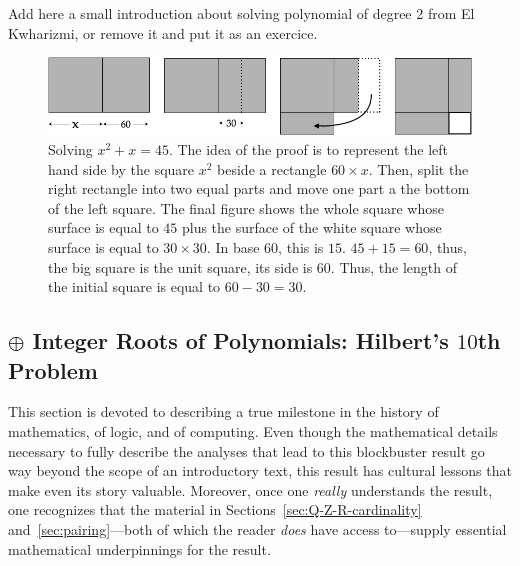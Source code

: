 {}
{\Denis Add here a small introduction about solving polynomial of degree 2 from El Kwharizmi, or remove it and put it as an exercice.}
\begin{figure}[htb]
\begin{center}
       \includegraphics[scale=0.4]{FiguresArithmetic/tabletteMesopotamie}
\caption{Solving $x^2 + x = 45$.
The idea of the proof is to represent the left hand side by the square $x^2$ beside a rectangle $60 \times x$.
Then, split the right rectangle into two equal parts and move one part a the bottom of the left square.
The final figure shows the whole square whose surface is equal to $45$ plus the surface of the white square
whose surface is equal to $30 \times 30$.
In base $60$, this is $15$. 
$45+15 = 60$, thus, the big square is the unit square, its side is $60$.
Thus, the length of the initial square is equal to $60-30=30$.}
\label{fig:equationBabillon}
\end{center}
\end{figure}


\subsection{$\oplus$ Integer Roots of Polynomials: Hilbert's $10$th Problem}
\label{sec:Hilberts-Tenth}

This section is devoted to describing a true milestone in the history
of mathematics, of logic, and of computing.  Even though the
mathematical details necessary to fully describe the analyses that lead
to this blockbuster result go way beyond the scope of an introductory
text, this result has cultural lessons that make even its story
valuable.  Moreover, once one {\em really} understands the result, one
recognizes that the material in Sections~\ref{sec:Q-Z-R-cardinality}
and~\ref{sec:pairing}---both of which the reader {\em does} have
access to---supply essential mathematical underpinnings for the result.

